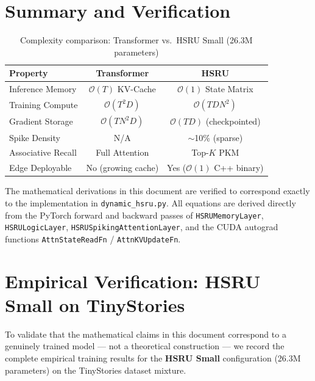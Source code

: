 \documentclass[11pt]{article}
\begin{document}
\section{Summary and Verification}

\begin{table}[h!]
\centering
\caption{Complexity comparison: Transformer vs.\ HSRU Small (26.3M parameters)}
\begin{tabular}{@{}lcc@{}}
\toprule
\textbf{Property} & \textbf{Transformer} & \textbf{HSRU} \\
\midrule
Inference Memory & $\mathcal{O}(T)$ KV-Cache & $\mathcal{O}(1)$ State Matrix \\
Training Compute & $\mathcal{O}(T^2 D)$ & $\mathcal{O}(T D N^2)$ \\
Gradient Storage & $\mathcal{O}(T N^2 D)$ & $\mathcal{O}(T D)$ (checkpointed) \\
Spike Density & N/A & $\sim$10\% (sparse) \\
Associative Recall & Full Attention & Top-$K$ PKM \\
Edge Deployable & No (growing cache) & Yes ($\mathcal{O}(1)$ C++ binary) \\
\bottomrule
\end{tabular}
\end{table}

The mathematical derivations in this document are verified to correspond exactly to the implementation in \texttt{dynamic\_hsru.py}. All equations are derived directly from the PyTorch forward and backward passes of \texttt{HSRUMemoryLayer}, \texttt{HSRULogicLayer}, \texttt{HSRUSpikingAttentionLayer}, and the CUDA autograd functions \texttt{AttnStateReadFn} / \texttt{AttnKVUpdateFn}.

\section{Empirical Verification: HSRU Small on TinyStories}

To validate that the mathematical claims in this document correspond to a genuinely trained model — not a theoretical construction — we record the complete empirical training results for the \textbf{HSRU Small} configuration (26.3M parameters) on the TinyStories dataset mixture.
\end{document}
